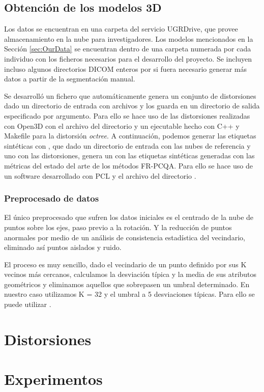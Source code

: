\subsection{Obtención de los modelos 3D}
Los datos se encuentran en una carpeta del servicio UGRDrive, que provee almacenamiento 
en la nube para investigadores. Los modelos mencionados en la Sección \ref{sec:OurData} 
se encuentran dentro de una carpeta numerada por cada individuo con los ficheros 
necesarios para el desarrollo del proyecto. Se incluyen incluso algunos directorios 
DICOM enteros por si fuera necesario generar más datos a partir de la segmentación 
manual. 

Se desarrolló un fichero  que automáticamente genera 
un conjunto de distorsiones dado un directorio de entrada con archivos  y los 
guarda en un directorio de salida especificado por argumento. Para ello se hace 
uso de las distorsiones realizadas con Open3D\cite{Open3D} 
con el archivo del directorio  y un ejecutable hecho 
con C++ y Makefile para la distorsión \emph{octree}. A continuación, 
podemos generar las etiquetas sintéticas con , que dado un 
directorio de entrada con las nubes de referencia y uno con las distorsiones, 
genera un  con las etiquetas sintéticas generadas con las métricas 
del estado del arte de los métodos FR-PCQA. Para ello se hace uso de un 
software desarrollado con PCL\cite{PCL} y el archivo del directorio . 

\subsubsection{Preprocesado de datos}
El único preprocesado que sufren los datos iniciales es el centrado de la nube 
de puntos sobre los ejes, paso previo a la rotación. Y la reducción de puntos 
anormales por medio de un análisis de consistencia estadística del vecindario,
eliminado así puntos aislados y ruido. 

El proceso es muy sencillo, dado el vecindario de un punto definido por sus 
K vecinos más cercanos, calculamos la desviación típica y la media de sus atributos 
geométricos y eliminamos aquellos que sobrepasen un umbral determinado. 
En nuestro caso utilizamos K = 32 y el umbral a 5 desviaciones típicas. Para 
ello se puede utilizar .

\section{Distorsiones}

\label{sec:DatosSinteticos}
\section{Experimentos} 
